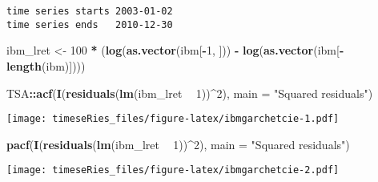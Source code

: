 \documentclass[]{book}
\newenvironment{Shaded}{\begin{snugshade}}{\end{snugshade}}
\newcommand{\KeywordTok}[1]{\textcolor[rgb]{0.13,0.29,0.53}{\textbf{#1}}}
\newcommand{\DataTypeTok}[1]{\textcolor[rgb]{0.13,0.29,0.53}{#1}}
\newcommand{\DecValTok}[1]{\textcolor[rgb]{0.00,0.00,0.81}{#1}}
\newcommand{\StringTok}[1]{\textcolor[rgb]{0.31,0.60,0.02}{#1}}
\newcommand{\OperatorTok}[1]{\textcolor[rgb]{0.81,0.36,0.00}{\textbf{#1}}}
\newcommand{\NormalTok}[1]{#1}
\begin{document}
\begin{verbatim}
time series starts 2003-01-02
time series ends   2010-12-30
\end{verbatim}

\begin{Shaded}
\begin{Highlighting}[]
\NormalTok{ibm_lret <-}\StringTok{ }\DecValTok{100} \OperatorTok{*}\StringTok{ }\NormalTok{(}\KeywordTok{log}\NormalTok{(}\KeywordTok{as.vector}\NormalTok{(ibm[}\OperatorTok{-}\DecValTok{1}\NormalTok{, ])) }\OperatorTok{-}\StringTok{ }\KeywordTok{log}\NormalTok{(}\KeywordTok{as.vector}\NormalTok{(ibm[}\OperatorTok{-}\KeywordTok{length}\NormalTok{(ibm)])))}

\NormalTok{TSA}\OperatorTok{::}\KeywordTok{acf}\NormalTok{(}\KeywordTok{I}\NormalTok{(}\KeywordTok{residuals}\NormalTok{(}\KeywordTok{lm}\NormalTok{(ibm_lret }\OperatorTok{~}\StringTok{ }\DecValTok{1}\NormalTok{))}\OperatorTok{^}\DecValTok{2}\NormalTok{), }\DataTypeTok{main =} \StringTok{"Squared residuals"}\NormalTok{)}
\end{Highlighting}
\end{Shaded}

\texttt{[image: timeseRies\_files/figure-latex/ibmgarchetcie-1.pdf]}

\begin{Shaded}
\begin{Highlighting}[]
\KeywordTok{pacf}\NormalTok{(}\KeywordTok{I}\NormalTok{(}\KeywordTok{residuals}\NormalTok{(}\KeywordTok{lm}\NormalTok{(ibm_lret }\OperatorTok{~}\StringTok{ }\DecValTok{1}\NormalTok{))}\OperatorTok{^}\DecValTok{2}\NormalTok{), }\DataTypeTok{main =} \StringTok{"Squared residuals"}\NormalTok{)}
\end{Highlighting}
\end{Shaded}

\texttt{[image: timeseRies\_files/figure-latex/ibmgarchetcie-2.pdf]}
\end{document}
